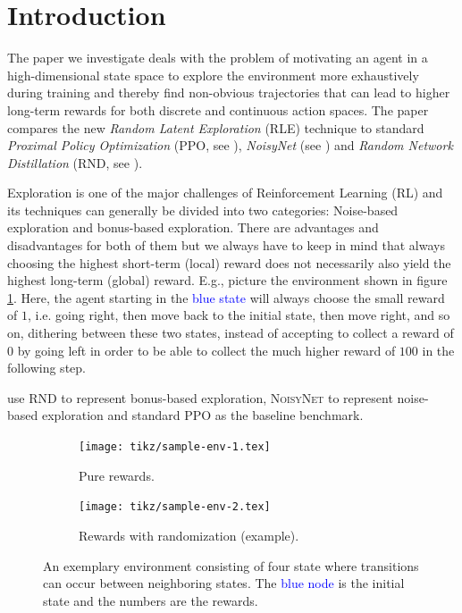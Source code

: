 \documentclass[10pt]{article} %
\begin{document}
\section{Introduction}
The paper we investigate deals with the problem of motivating an agent in a high-dimensional state space to explore the environment more exhaustively during training and thereby find non-obvious trajectories that can lead to higher long-term rewards for both discrete and continuous action spaces. The paper compares the new \textit{Random Latent Exploration} (\textsc{RLE}) technique to standard \textit{Proximal Policy Optimization} (\textsc{PPO}, see \cite{ppo-paper}), \textit{NoisyNet} (see \cite{noisynet-paper}) and \textit{Random Network Distillation} (\textsc{RND}, see \cite{rnd-paper}).

\noindent Exploration is one of the major challenges of Reinforcement Learning (RL) and its techniques can generally be divided into two categories: Noise-based exploration and bonus-based exploration. There are advantages and disadvantages for both of them but we always have to keep in mind that always choosing the highest short-term (local) reward does not necessarily also yield the highest long-term (global) reward. E.g., picture the environment shown in figure \ref{fig:sample-env-1}. Here, the agent starting in the \textcolor{blue}{blue state} will always choose the small reward of $1$, i.e. going right, then move back to the initial state, then move right, and so on, dithering between these two states, instead of accepting to collect a reward of $0$ by going left in order to be able to collect the much higher reward of $100$ in the following step.

\noindent \cite{rle-paper} use \textsc{RND} to represent bonus-based exploration, \textsc{NoisyNet} to represent noise-based exploration and standard \textsc{PPO} as the baseline benchmark.

\begin{figure}[h!]
  \centering
  \begin{subfigure}[b]{0.45\textwidth}
    \centering
    \texttt{[image: tikz/sample-env-1.tex]}
    \caption{Pure rewards.}
    \label{fig:sample-env-1}
  \end{subfigure}
  \hfill
  \begin{subfigure}[b]{0.45\textwidth}
    \centering
    \texttt{[image: tikz/sample-env-2.tex]}
    \caption{Rewards with randomization (example).}
    \label{fig:sample-env-2}
  \end{subfigure}
  
  \caption{An exemplary environment consisting of four state where transitions can occur between neighboring states. The \textcolor{blue}{blue node} is the initial state and the numbers are the rewards.}
  \label{fig:sample-env}
\end{figure}
\end{document}

